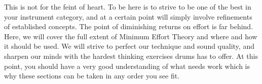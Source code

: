 \documentclass[12pt,letterpaper]{book}
\begin{document}
This is not for the feint of heart.  To be here is to strive to be one of the best in your instrument category, and at a certain point will simply involve refinements of established concepts.  The point of diminishing returns on effort is far behind.  Here, we will cover the full extent of Minimum Effort Theory and where and how it should be used.  We will strive to perfect our technique and sound quality, and sharpen our minds with the hardest thinking exercises drums has to offer.  At this point, you should have a very good understanding of what needs work which is why these sections can be taken in any order you see fit.
\end{document}
